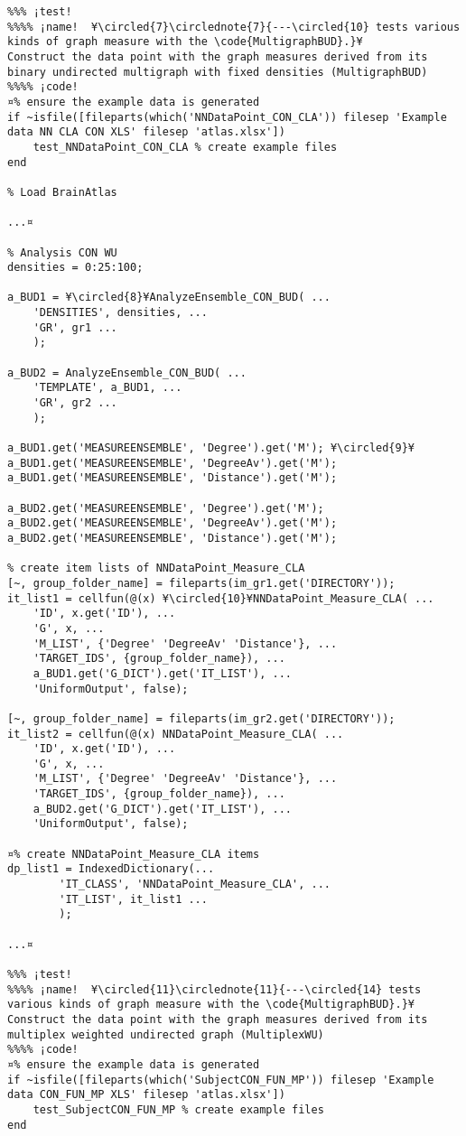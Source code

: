 \documentclass{tufte-handout}
\begin{document}
\begin{lstlisting}
%%% ¡test!
%%%% ¡name!  ¥\circled{7}\circlednote{7}{---\circled{10} tests various kinds of graph measure with the \code{MultigraphBUD}.}¥
Construct the data point with the graph measures derived from its binary undirected multigraph with fixed densities (MultigraphBUD)
%%%% ¡code!
¤% ensure the example data is generated
if ~isfile([fileparts(which('NNDataPoint_CON_CLA')) filesep 'Example data NN CLA CON XLS' filesep 'atlas.xlsx'])
    test_NNDataPoint_CON_CLA % create example files
end

% Load BrainAtlas

...¤

% Analysis CON WU
densities = 0:25:100;

a_BUD1 = ¥\circled{8}¥AnalyzeEnsemble_CON_BUD( ...
    'DENSITIES', densities, ...
    'GR', gr1 ...
    );

a_BUD2 = AnalyzeEnsemble_CON_BUD( ...
    'TEMPLATE', a_BUD1, ...
    'GR', gr2 ...
    );

a_BUD1.get('MEASUREENSEMBLE', 'Degree').get('M'); ¥\circled{9}¥
a_BUD1.get('MEASUREENSEMBLE', 'DegreeAv').get('M');
a_BUD1.get('MEASUREENSEMBLE', 'Distance').get('M');

a_BUD2.get('MEASUREENSEMBLE', 'Degree').get('M');
a_BUD2.get('MEASUREENSEMBLE', 'DegreeAv').get('M');
a_BUD2.get('MEASUREENSEMBLE', 'Distance').get('M');

% create item lists of NNDataPoint_Measure_CLA
[~, group_folder_name] = fileparts(im_gr1.get('DIRECTORY'));
it_list1 = cellfun(@(x) ¥\circled{10}¥NNDataPoint_Measure_CLA( ...
    'ID', x.get('ID'), ...
    'G', x, ...
    'M_LIST', {'Degree' 'DegreeAv' 'Distance'}, ...
    'TARGET_IDS', {group_folder_name}), ...
    a_BUD1.get('G_DICT').get('IT_LIST'), ...
    'UniformOutput', false);

[~, group_folder_name] = fileparts(im_gr2.get('DIRECTORY'));
it_list2 = cellfun(@(x) NNDataPoint_Measure_CLA( ...
    'ID', x.get('ID'), ...
    'G', x, ...
    'M_LIST', {'Degree' 'DegreeAv' 'Distance'}, ...
    'TARGET_IDS', {group_folder_name}), ...
    a_BUD2.get('G_DICT').get('IT_LIST'), ...
    'UniformOutput', false);

¤% create NNDataPoint_Measure_CLA items
dp_list1 = IndexedDictionary(...
        'IT_CLASS', 'NNDataPoint_Measure_CLA', ...
        'IT_LIST', it_list1 ...
        );

...¤

%%% ¡test!
%%%% ¡name!  ¥\circled{11}\circlednote{11}{---\circled{14} tests various kinds of graph measure with the \code{MultigraphBUD}.}¥
Construct the data point with the graph measures derived from its multiplex weighted undirected graph (MultiplexWU) 
%%%% ¡code!
¤% ensure the example data is generated
if ~isfile([fileparts(which('SubjectCON_FUN_MP')) filesep 'Example data CON_FUN_MP XLS' filesep 'atlas.xlsx'])
    test_SubjectCON_FUN_MP % create example files
end


\end{lstlisting}
\end{document}
